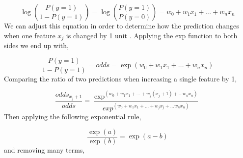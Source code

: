 \begin{equation}
    \log \left( \frac{P(y=1)}{1 - P(y=1)} \right) = \log \left( \frac{P(y=1)}{P(y=0)} \right) = w_{0} + w_{1}x_{1} + ... + w_{n}x_{n}
\end{equation}
We can adjust this equation in order to determine how the prediction changes when one feature $x_{j}$ is changed by 1 unit \cite{molnar2019}. Applying the exp function to both sides we end up with,

\begin{equation}
     \frac{P(y=1)}{1 - P(y=1)} = odds = \exp( w_{0} + w_{1}x_{1} + ... + w_{n}x_{n})
\end{equation}
Comparing the ratio of two predictions when increasing a single feature by 1,

\begin{equation}
    \frac{odds_{x_{j}+1}}{odds} = \frac{\exp^( w_{0} + w_{1}x_{1} + ... + w_{j}(x_{j} + 1) + ... w_{n}x_{n})}{exp^( w_{0} + w_{1}x_{1} + ... + w_{j}x_{j} + ... w_{n}x_{n})}
\end{equation}
Then applying the following exponential rule,

\begin{equation}
    \frac{\exp(a)}{\exp(b)} = \exp(a - b)
\end{equation}
and removing many terms,


